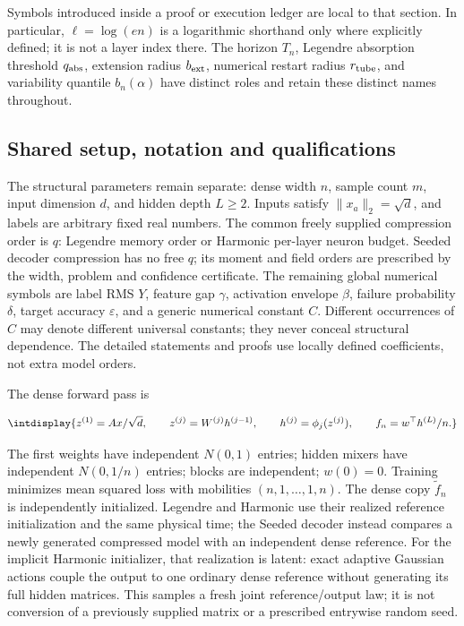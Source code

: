 Symbols introduced inside a proof or execution ledger are local to that
section. In particular, \(\ell=\log(en)\) is a logarithmic shorthand
only where explicitly defined; it is not a layer index there.
The horizon \(T_n\), Legendre absorption threshold \(q_{\rm abs}\),
extension radius \(b_{\rm ext}\), numerical restart radius
\(r_{\rm tube}\), and variability quantile \(b_n(\alpha)\) have
distinct roles and retain these distinct names throughout.


\subsection{Shared setup, notation and qualifications}



The structural parameters remain separate: dense width \(n\), sample count \(m\), input dimension \(d\), and hidden depth \(L\ge2\). Inputs satisfy \(\|x_a\|_2=\sqrt d\), and labels are arbitrary fixed real numbers. The common freely supplied compression order is \(q\): Legendre memory order or Harmonic per-layer neuron budget. Seeded decoder compression has no free \(q\); its moment and field orders are prescribed by the width, problem and confidence certificate. The remaining global numerical symbols are label RMS \(Y\), feature gap \(\gamma\), activation envelope \(\beta\), failure probability \(\delta\), target accuracy \(\varepsilon\), and a generic numerical constant \(C\). Different occurrences of \(C\) may denote different universal constants; they never conceal structural dependence. The detailed statements and proofs use locally defined coefficients, not extra model orders.



The dense forward pass is


\begingroup\renewcommand{\theHequation}{intdisplay.1}
\begin{equation*}
\intdisplay{
z^{(1)}=Ax/\sqrt d,\qquad
z^{(j)}=W^{(j)}h^{(j-1)},\qquad h^{(j)}=\phi_j(z^{(j)}),
\qquad f_n=w^\top h^{(L)}/n.
}
\end{equation*}
\endgroup


The first weights have independent \(N(0,\allowbreak 1)\) entries; hidden mixers have independent \(N(0,\allowbreak 1/n)\) entries; blocks are independent; \(w(0)=0\). Training minimizes mean squared loss with mobilities \((n,\allowbreak 1,\allowbreak \ldots,\allowbreak 1,\allowbreak n)\). The dense copy \(\widetilde f_n\) is independently initialized. Legendre and Harmonic use their realized reference initialization and the same physical time; the Seeded decoder instead compares a newly generated compressed model with an independent dense reference. For the implicit Harmonic initializer, that realization is latent: exact adaptive Gaussian actions couple the output to one ordinary dense reference without generating its full hidden matrices. This samples a fresh joint reference/output law; it is not conversion of a previously supplied matrix or a prescribed entrywise random seed.



